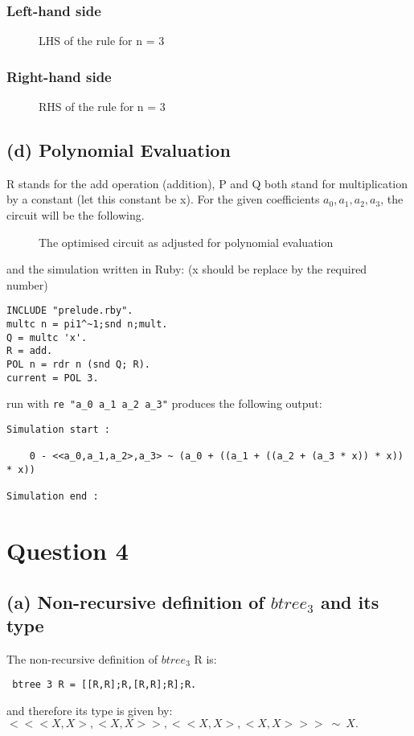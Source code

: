 \documentclass[a4paper,10pt]{article}
\begin{document}
\subsubsection*{Left-hand side}
\begin{figure}[H]
\begin{center}

\caption{LHS of the rule for n = 3}
\end{center}
\end{figure}
\subsubsection*{Right-hand side}
\begin{figure}[H]
\begin{center}

\caption{RHS of the rule for n = 3}
\end{center}
\end{figure}
\subsection*{(d) Polynomial Evaluation}
R stands for the add operation (addition), P and Q both stand for multiplication by a constant (let this constant be x).
For the given coefficients $a_0,a_1,a_2,a_3$, the circuit will be the following.
\begin{figure}[H]
\begin{center}

\caption{The optimised circuit as adjusted for polynomial evaluation}
\end{center}
\end{figure}
and the simulation written in Ruby: (x should be replace by the required number)
\begin{Verbatim}
INCLUDE "prelude.rby".
multc n = pi1^~1;snd n;mult.
Q = multc 'x'.
R = add.
POL n = rdr n (snd Q; R).
current = POL 3.
\end{Verbatim}
run with \verb|re "a_0 a_1 a_2 a_3"| produces the following output:
\begin{Verbatim}
Simulation start :

    0 - <<a_0,a_1,a_2>,a_3> ~ (a_0 + ((a_1 + ((a_2 + (a_3 * x)) * x)) * x))

Simulation end :
\end{Verbatim}
\section*{Question 4}
\subsection*{(a) Non-recursive definition of $btree_3$ and its type}
The non-recursive definition of $btree_3$ R is:
\begin{Verbatim}
 btree 3 R = [[R,R];R,[R,R];R];R.
\end{Verbatim}
and therefore its type is given by: \\[0.25cm]
$<<<X,X>,<X,X>>,<<X,X>,<X,X>>>\:  \sim \: X.$
\end{document}
